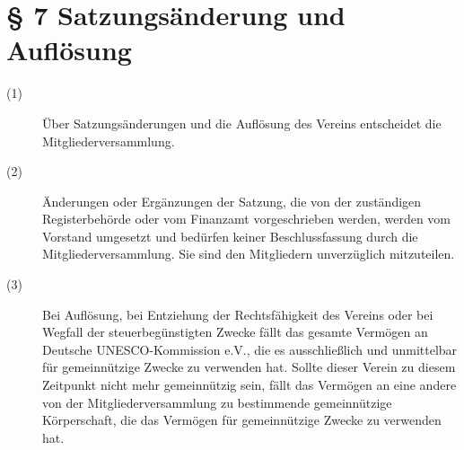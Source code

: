 \documentclass[a4paper,12pt]{scrartcl}
\begin{document}
\section*{\S{} 7 Satzungsänderung und Auflösung}
\begin{description} 

\item[(1)] Über Satzungsänderungen und die Auflösung des Vereins entscheidet die Mitgliederversammlung.
\item[(2)] Änderungen oder Ergänzungen der Satzung, die von der zuständigen Registerbehörde oder vom Finanzamt vorgeschrieben werden, werden vom Vorstand umgesetzt und bedürfen keiner Beschlussfassung durch die Mitgliederversammlung. Sie sind den Mitgliedern unverzüglich mitzuteilen.
\item[(3)] Bei Auflösung, bei Entziehung der Rechtsfähigkeit des Vereins oder bei Wegfall der steuerbegünstigten Zwecke fällt das gesamte Vermögen an Deutsche UNESCO-Kommission e.V., die es ausschließlich und unmittelbar für gemeinnützige Zwecke zu verwenden hat. Sollte dieser Verein zu diesem Zeitpunkt nicht mehr gemeinnützig sein, fällt das Vermögen an eine andere von der Mitgliederversammlung zu bestimmende gemeinnützige Körperschaft, die das Vermögen für gemeinnützige Zwecke zu verwenden hat.

\end{description}
\end{document}
